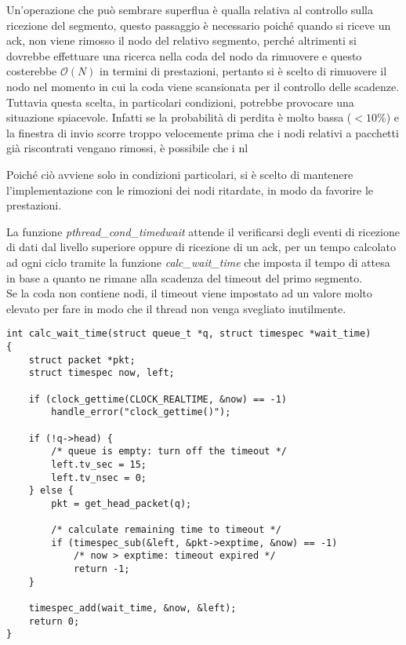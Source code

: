 Un'operazione che può sembrare superflua è qualla relativa al controllo sulla 
ricezione del segmento, questo passaggio è necessario poiché quando si 
riceve un ack, non viene rimosso il nodo del relativo segmento, perché 
altrimenti si dovrebbe effettuare una ricerca nella coda del nodo da rimuovere
e questo costerebbe $\mathcal{O}(N)$ in termini di prestazioni, pertanto si è 
scelto di rimuovere il nodo nel momento in cui la coda viene scansionata per 
il controllo delle scadenze.\\
Tuttavia questa scelta, in particolari condizioni, potrebbe provocare una
situazione spiacevole.
Infatti se la probabilità di perdita è molto bassa ($ <10\%$) e la finestra 
di invio scorre troppo velocemente prima che i nodi relativi a pacchetti già 
riscontrati vengano rimossi, è possibile che i nl

Poiché ciò avviene solo in condizioni particolari, si è scelto di mantenere
l'implementazione con le rimozioni dei nodi ritardate, in modo da favorire le
prestazioni.

La funzione \emph{pthread\_cond\_timedwait} attende il verificarsi degli 
eventi di ricezione di dati dal livello superiore oppure di ricezione di
un ack, per un tempo calcolato ad ogni ciclo tramite la funzione
\emph{calc\_wait\_time} che imposta il tempo di attesa in base a quanto 
ne rimane alla scadenza del timeout del primo segmento.\\
Se la coda non contiene nodi, il timeout viene impostato ad un valore
molto elevato per fare in modo che il thread non venga svegliato 
inutilmente.
\begin{lstlisting}[title=transport.c]
int calc_wait_time(struct queue_t *q, struct timespec *wait_time)
{
    struct packet *pkt;
    struct timespec now, left;

    if (clock_gettime(CLOCK_REALTIME, &now) == -1)
        handle_error("clock_gettime()");

    if (!q->head) {
        /* queue is empty: turn off the timeout */
        left.tv_sec = 15;
        left.tv_nsec = 0;
    } else {
        pkt = get_head_packet(q);

        /* calculate remaining time to timeout */
        if (timespec_sub(&left, &pkt->exptime, &now) == -1)
            /* now > exptime: timeout expired */
            return -1;
    }

    timespec_add(wait_time, &now, &left);
    return 0;
}
\end{lstlisting}
